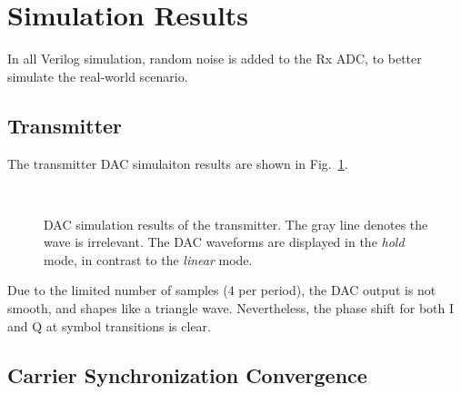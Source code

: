 \documentclass[journal,twoside]{IEEEtran}
\begin{document}
  \section{Simulation Results}

    In all Verilog simulation,
    random noise is added to the Rx ADC, to better simulate the real-world scenario.

    \subsection{Transmitter}

      The transmitter DAC simulaiton results are shown in Fig.~\ref{fig:tx_dac_sim}.
      \begin{figure}[htbp]
        \setlength{\tabcolsep}{2pt}
        \\
        \caption{DAC simulation results of the transmitter.
          The gray line denotes the wave is irrelevant.
          The DAC waveforms are displayed in the \textit{hold} mode, in contrast to the \textit{linear} mode.}
        \label{fig:tx_dac_sim}
      \end{figure}

      Due to the limited number of samples (4 per period), the DAC output is not smooth, and shapes like a triangle wave.
      Nevertheless, the phase shift for both I and Q at symbol transitions is clear.

    \subsection{Carrier Synchronization Convergence}\label{subsec:costas_convergence}
\end{document}
